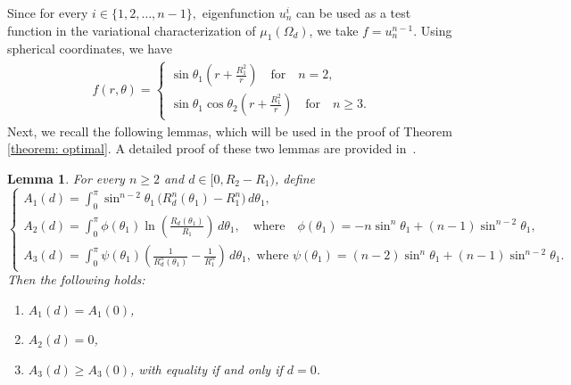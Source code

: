 \documentclass[12pt,reqno]{amsart}
\newtheorem{lemma}{Lemma}[section]
\numberwithin{equation}{section}
\numberwithin{theorem}{section}
\numberwithin{equation}{section}
\numberwithin{theorem}{section}
\begin{document}
Since for every $i\in \{1,2, \dots, n-1\},$ eigenfunction $u_n^i$ can be used as a test function in the variational characterization of $\mu_1(\Omega_d)$, we take $f=u_n^{n-1}$. Using spherical coordinates, we have 
 \begin{align} \label{test function}
     f(r,\theta)= \begin{cases}
         \sin \theta_1 \left(r+\frac{R_1^2}{r}\right) \quad \text{for} \quad n=2,\\
         \sin \theta_1 \cos \theta_2 \left(r+\frac{R_1^2}{r}\right) \quad \text{for} \quad n \geq 3.
     \end{cases}
     \end{align}
Next, we recall the following lemmas, which will be used in the proof of Theorem \ref{theorem: optimal}. A detailed proof of these two lemmas are provided in~\cite{ftouhi2022place}.
\begin{lemma} \label{A comparison}
For every $n \geq 2$ and $d \in [0, R_2 - R_1)$, define
\[
\begin{cases}
A_1(d) = \displaystyle \int_{0}^{\pi} \sin^{n-2}\theta_1 \, \big( R_d^n(\theta_1) - R_1^n \big) \, d\theta_1, \\[8pt]
A_2(d) = \displaystyle \int_{0}^{\pi} \phi(\theta_1)
\ln\!\left( \frac{R_d(\theta_1)}{R_1} \right) \, d\theta_1, 
\quad \text{where} \quad 
\phi(\theta_1) = -n\sin^n\theta_1 + (n-1)\sin^{n-2}\theta_1, \\[8pt]
A_3(d) = \displaystyle \int_{0}^{\pi} \psi(\theta_1)
\left( \frac{1}{R_d^n(\theta_1)} - \frac{1}{R_1^n} \right) \, d\theta_1, 
\,\, \text{where}\,\,
\psi(\theta_1) = (n-2)\sin^n\theta_1 + (n-1)\sin^{n-2}\theta_1.
\end{cases}
\]
 Then the following holds:
\begin{enumerate}
    \item $A_1(d) = A_1(0)$,
    \item $A_2(d) = 0 $,
    \item $A_3(d) \geq A_3(0)$, with equality if and only if $d = 0$.
\end{enumerate}
\end{lemma}
\end{document}
